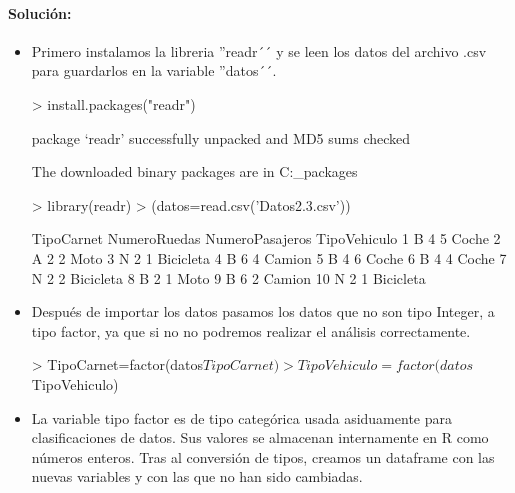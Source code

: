 \documentclass[a4paper, 12pt]{article}
\begin{document}
	\paragraph{Solución:}
	\begin{itemize}
		\item Primero instalamos la libreria ''readr´´ y se leen los datos del archivo .csv para guardarlos en la variable ''datos´´.
\begin{Schunk}
\begin{Sinput}
> install.packages("readr")
\end{Sinput}
\begin{Soutput}
package ‘readr’ successfully unpacked and MD5 sums checked

The downloaded binary packages are in
	C:\Users{}\AppData\Local\Temp\RtmpemczRZ\downloaded_packages
\end{Soutput}
\begin{Sinput}
> library(readr)
> (datos=read.csv('Datos2.3.csv'))
\end{Sinput}
\begin{Soutput}
   TipoCarnet NumeroRuedas NumeroPasajeros TipoVehiculo
1           B            4               5        Coche
2           A            2               2         Moto
3           N            2               1    Bicicleta
4           B            6               4       Camion
5           B            4               6        Coche
6           B            4               4        Coche
7           N            2               2    Bicicleta
8           B            2               1         Moto
9           B            6               2       Camion
10          N            2               1    Bicicleta
\end{Soutput}
\end{Schunk}
		\item Después de importar los datos pasamos los datos que no son tipo Integer, a tipo factor, ya que si no no podremos realizar el análisis correctamente.
\begin{Schunk}
\begin{Sinput}
> TipoCarnet=factor(datos$TipoCarnet)
> TipoVehiculo=factor(datos$TipoVehiculo)
\end{Sinput}
\end{Schunk}
		\item La variable tipo factor es de tipo categórica usada asiduamente para clasificaciones de datos. Sus valores se almacenan internamente en R como números enteros. Tras al conversión de tipos, creamos un dataframe con las nuevas variables y con las que no han sido cambiadas.

\end{itemize}
\end{document}
